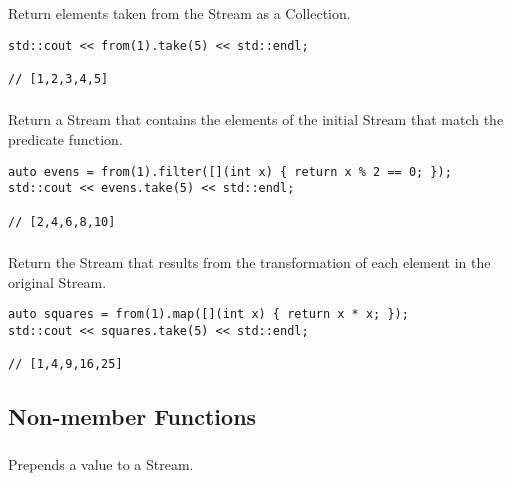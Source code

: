 \subsubsection{}

Return  elements taken from the Stream as a Collection.

\begin{lstlisting}[title=example]
std::cout << from(1).take(5) << std::endl;

// [1,2,3,4,5]
\end{lstlisting}

\subsubsection{}

Return a Stream that contains the elements of the initial Stream that match the predicate function.

\begin{lstlisting}[title=example]
auto evens = from(1).filter([](int x) { return x % 2 == 0; });
std::cout << evens.take(5) << std::endl;

// [2,4,6,8,10]
\end{lstlisting}

\subsubsection{}

Return the Stream that results from the transformation of each element in the original Stream.

\begin{lstlisting}[title=example]
auto squares = from(1).map([](int x) { return x * x; });
std::cout << squares.take(5) << std::endl;

// [1,4,9,16,25]
\end{lstlisting}

\subsection{Non-member Functions}

\subsubsection{}

Prepends a value to a Stream.

